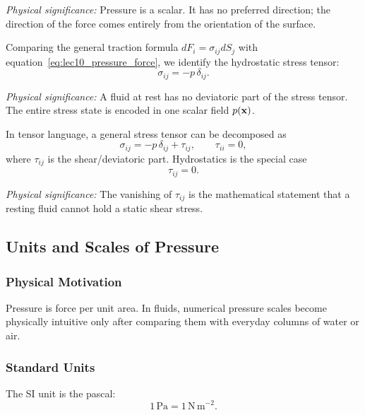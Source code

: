 \documentclass[../main.tex]{subfiles}
\begin{document}
\textit{Physical significance:} Pressure is a scalar. It has no preferred direction; the direction of the force comes entirely from the orientation of the surface.

Comparing the general traction formula $dF_i=\sigma_{ij}dS_j$ with equation~\eqref{eq:lec10_pressure_force}, we identify the hydrostatic stress tensor:
\begin{equation}
  \boxed{\sigma_{ij}=-p\,\delta_{ij}.}
  \label{eq:lec10_hydrostatic_stress}
\end{equation}

\textit{Physical significance:} A fluid at rest has no deviatoric part of the stress tensor. The entire stress state is encoded in one scalar field $p(\mathbf{x})$.

In tensor language, a general stress tensor can be decomposed as
\begin{equation}
  \sigma_{ij}
  =
  -p\,\delta_{ij}
  +
  \tau_{ij},
  \qquad
  \tau_{ii}=0,
  \label{eq:lec10_stress_decomposition}
\end{equation}
where $\tau_{ij}$ is the shear/deviatoric part. Hydrostatics is the special case
\begin{equation}
  \boxed{\tau_{ij}=0.}
  \label{eq:lec10_no_deviatoric_stress}
\end{equation}

\textit{Physical significance:} The vanishing of $\tau_{ij}$ is the mathematical statement that a resting fluid cannot hold a static shear stress.

\subsection{Units and Scales of Pressure}\label{sec:lec10:pressure-units}

\subsubsection*{Physical Motivation}
Pressure is force per unit area. In fluids, numerical pressure scales become physically intuitive only after comparing them with everyday columns of water or air.

\subsubsection*{Standard Units}
The SI unit is the pascal:
\begin{equation}
  \boxed{1\,\mathrm{Pa}=1\,\mathrm{N\,m^{-2}}.}
  \label{eq:lec10_pascal}
\end{equation}
\end{document}
